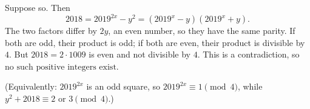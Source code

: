 Suppose so. Then
\[
2018=2019^{2x}-y^2=\left(2019^x-y\right)\left(2019^x+y\right).
\]
The two factors differ by $2y$, an even number, so they have the same parity. If both are odd, their product is odd; if both are even, their product is divisible by $4$. But $2018=2\cdot1009$ is even and not divisible by $4$. This is a contradiction, so $\boxed{\text{no such positive integers exist}}$.

(Equivalently: $2019^{2x}$ is an odd square, so $2019^{2x}\equiv1\pmod 4$, while $y^2+2018\equiv2$ or $3\pmod 4$.)
